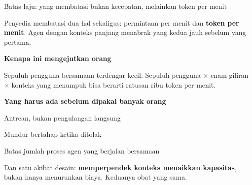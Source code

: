 \documentclass[aspectratio=169,11pt,t]{beamer}
\begin{document}
\begin{frame}[shrink=25]{Batas laju: yang membatasi bukan kecepatan, melainkan token per menit}
{\fontsize{9.4}{12.6}\selectfont\color{fg2}Penyedia membatasi dua hal sekaligus: permintaan per menit dan \textbf{token per menit}. Agen dengan konteks panjang menabrak yang kedua jauh sebelum yang pertama.\par}\vskip 4pt
\begin{minipage}[t]{0.485\textwidth}
{\fontsize{9.4}{12.6}\selectfont\color{fg2}\textbf{Kenapa ini mengejutkan orang}\par}\vskip 4pt
{\fontsize{9.4}{12.6}\selectfont\color{fg2}Sepuluh pengguna bersamaan terdengar kecil. Sepuluh pengguna $\times$ enam giliran $\times$ konteks yang menumpuk bisa berarti ratusan ribu token per menit.\par}\vskip 4pt

\end{minipage}%
\hfill
\begin{minipage}[t]{0.485\textwidth}
{\fontsize{9.4}{12.6}\selectfont\color{fg2}\textbf{Yang harus ada sebelum dipakai banyak orang}\par}\vskip 4pt
\begin{ibullets}
\item Antrean, bukan pengulangan langsung
\item Mundur bertahap ketika ditolak
\item Batas jumlah proses agen yang berjalan bersamaan
\end{ibullets}

\end{minipage}%
\begin{iband}[signal]
Dan satu akibat desain: \textbf{memperpendek konteks menaikkan kapasitas}, bukan hanya menurunkan biaya. Keduanya obat yang sama.
\end{iband}
\end{frame}
\end{document}
